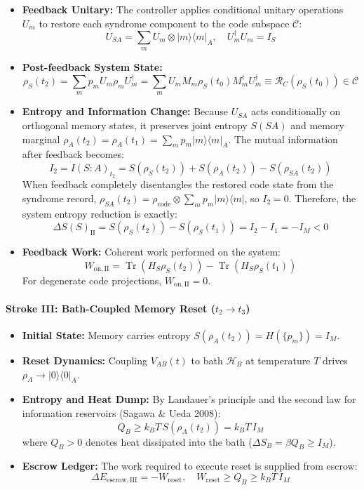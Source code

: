 \documentclass[
]{article}
\providecommand{\tightlist}{%
  \setlength{\itemsep}{0pt}\setlength{\parskip}{0pt}}
\begin{document}
\begin{itemize}
\tightlist
\item
  \textbf{Feedback Unitary:} The controller applies conditional unitary
  operations \(U_m\) to restore each syndrome component to the code
  subspace \(\mathcal{C}\):
  \[U_{SA} = \sum_m U_m \otimes |m\rangle\langle m|_A, \quad U_m^\dagger U_m = I_S\]
\item
  \textbf{Post-feedback System State:}
  \[\rho_S(t_2) = \sum_m p_m U_m \rho_m U_m^\dagger = \sum_m U_m M_m \rho_S(t_0) M_m^\dagger U_m^\dagger \equiv \mathcal{R}_C(\rho_S(t_0)) \in \mathcal{C}\]
\item
  \textbf{Entropy and Information Change:} Because \(U_{SA}\) acts
  conditionally on orthogonal memory states, it preserves joint entropy
  \(S(SA)\) and memory marginal
  \(\rho_A(t_2) = \rho_A(t_1) = \sum_m p_m |m\rangle\langle m|_A\). The
  mutual information after feedback becomes:
  \[I_2 = I(S : A)_{t_2} = S(\rho_S(t_2)) + S(\rho_A(t_2)) - S(\rho_{SA}(t_2))\]
  When feedback completely disentangles the restored code state from the
  syndrome record,
  \(\rho_{SA}(t_2) = \rho_{\mathrm{code}} \otimes \sum_m p_m |m\rangle\langle m|\),
  so \(I_2 = 0\). Therefore, the system entropy reduction is exactly:
  \[\Delta S(S)_{\mathrm{II}} = S(\rho_S(t_2)) - S(\rho_S(t_1)) = I_2 - I_1 = -I_M < 0\]
\item
  \textbf{Feedback Work:} Coherent work performed on the system:
  \[W_{\mathrm{on,II}} = \operatorname{Tr}(H_S \rho_S(t_2)) - \operatorname{Tr}(H_S \rho_S(t_1))\]
  For degenerate code projections, \(W_{\mathrm{on,II}} = 0\).
\end{itemize}

\paragraph{\texorpdfstring{Stroke III: Bath-Coupled Memory Reset
(\(t_2 \to t_3\))}{Stroke III: Bath-Coupled Memory Reset (t\_2 \textbackslash to t\_3)}}\label{stroke-iii-bath-coupled-memory-reset-t_2-to-t_3}

\begin{itemize}
\tightlist
\item
  \textbf{Initial State:} Memory carries entropy
  \(S(\rho_A(t_2)) = H(\{p_m\}) = I_M\).
\item
  \textbf{Reset Dynamics:} Coupling \(V_{AB}(t)\) to bath
  \(\mathcal{H}_B\) at temperature \(T\) drives
  \(\rho_A \to |0\rangle\langle 0|_A\).
\item
  \textbf{Entropy and Heat Dump:} By Landauer's principle and the second
  law for information reservoirs (Sagawa \& Ueda 2008):
  \[Q_B \ge k_B T \, S(\rho_A(t_2)) = k_B T \, I_M\] where \(Q_B > 0\)
  denotes heat dissipated into the bath
  (\(\Delta S_B = \beta Q_B \ge I_M\)).
\item
  \textbf{Escrow Ledger:} The work required to execute reset is supplied
  from escrow:
  \[\Delta E_{\mathrm{escrow,III}} = -W_{\mathrm{reset}}, \quad W_{\mathrm{reset}} \ge Q_B \ge k_B T \, I_M\]
\end{itemize}
\end{document}
